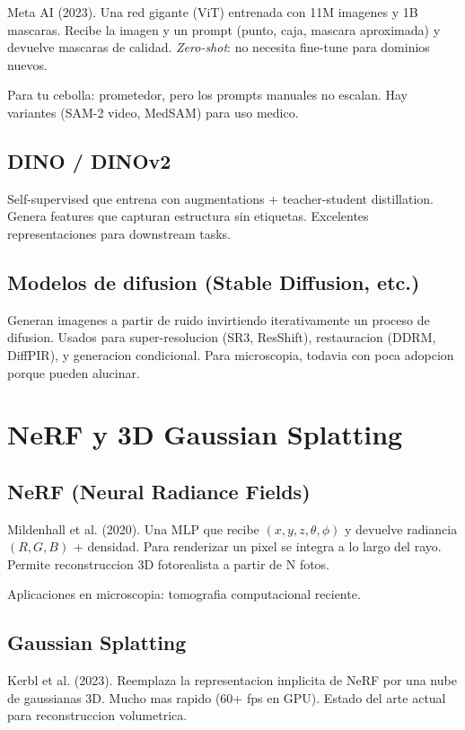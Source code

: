 \documentclass[11pt,a4paper,twoside,openright]{book}
\begin{document}
Meta AI (2023). Una red gigante (ViT) entrenada con 11M imagenes y 1B mascaras. Recibe la imagen y un prompt (punto, caja, mascara aproximada) y devuelve mascaras de calidad. \emph{Zero-shot}: no necesita fine-tune para dominios nuevos.

Para tu cebolla: prometedor, pero los prompts manuales no escalan. Hay variantes (SAM-2 video, MedSAM) para uso medico.

\section{DINO / DINOv2}

Self-supervised que entrena con augmentations + teacher-student distillation. Genera features que capturan estructura sin etiquetas. Excelentes representaciones para downstream tasks.

\section{Modelos de difusion (Stable Diffusion, etc.)}

Generan imagenes a partir de ruido invirtiendo iterativamente un proceso de difusion. Usados para super-resolucion (SR3, ResShift), restauracion (DDRM, DiffPIR), y generacion condicional. Para microscopia, todavia con poca adopcion porque pueden alucinar.

\chapter{NeRF y 3D Gaussian Splatting}

\section{NeRF (Neural Radiance Fields)}

Mildenhall et al. (2020). Una MLP que recibe $(x, y, z, \theta, \phi)$ y devuelve radiancia $(R, G, B)$ + densidad. Para renderizar un pixel se integra a lo largo del rayo. Permite reconstruccion 3D fotorealista a partir de N fotos.

Aplicaciones en microscopia: tomografia computacional reciente.

\section{Gaussian Splatting}

Kerbl et al. (2023). Reemplaza la representacion implicita de NeRF por una nube de gaussianas 3D. Mucho mas rapido (60+ fps en GPU). Estado del arte actual para reconstruccion volumetrica.
\end{document}
